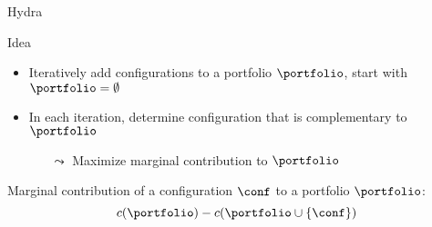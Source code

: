 %
\begin{frame}[c]{Hydra~}

\begin{block}{Idea}
\begin{itemize}
\item Iteratively add configurations to a portfolio $\portfolio$, start with $\portfolio = \emptyset$
\item In each iteration, determine configuration that is complementary to~$\portfolio$
\begin{itemize}
\item[$\leadsto$] Maximize marginal contribution to $\portfolio$
\end{itemize}
\end{itemize}

\pause

Marginal contribution of a configuration $\conf$ to a portfolio $\portfolio$:
\begin{equation}
c(\portfolio) -  c(\portfolio \cup \{\conf\})  \nonumber
\end{equation}

\end{block}

\pause

\scalebox{0.7}{
		

}

\end{frame}

